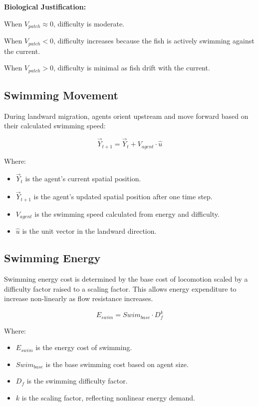 \documentclass[
]{book}
\providecommand{\tightlist}{%
  \setlength{\itemsep}{0pt}\setlength{\parskip}{0pt}}
\begin{document}
\textbf{Biological Justification:}

When \(V_{patch} \approx 0\), difficulty is moderate.

When \(V_{patch} < 0\), difficulty increases because the fish is actively swimming against the current.

When \(V_{patch} > 0\), difficulty is minimal as fish drift with the current.

\subsection{Swimming Movement}\label{swimming-movement}

During landward migration, agents orient upstream and move forward based on their calculated swimming speed:

\[ \vec{Y}_{t+1} = \vec{Y}_t + V_{agent} \cdot \hat{u} \]

Where:

\begin{itemize}
\tightlist
\item
  \(\vec{Y}_t\) is the agent's current spatial position.
\item
  \(\vec{Y}_{t+1}\) is the agent's updated spatial position after one time step.
\item
  \(V_{agent}\) is the swimming speed calculated from energy and difficulty.
\item
  \(\hat{u}\) is the unit vector in the landward direction.
\end{itemize}

\subsection{Swimming Energy}\label{swimming-energy}

Swimming energy cost is determined by the base cost of locomotion scaled by a difficulty factor raised to a scaling factor. This allows energy expenditure to increase non-linearly as flow resistance increases.

\[ E_{swim} = Swim_{base} \cdot D_f^{k} \]

Where:

\begin{itemize}
\tightlist
\item
  \(E_{swim}\) is the energy cost of swimming.
\item
  \(Swim_{base}\) is the base swimming cost based on agent size.
\item
  \(D_f\) is the swimming difficulty factor.
\item
  \(k\) is the scaling factor, reflecting nonlinear energy demand.
\end{itemize}
\end{document}
